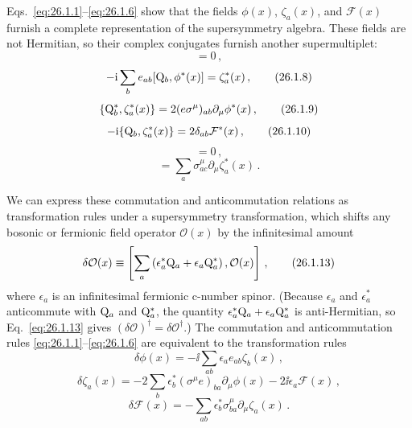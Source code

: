 Eqs.~\eqref{eq:26.1.1}--\eqref{eq:26.1.6} show that the fields
\(\phi(x)\), \(\zeta_a(x)\), and \(\mathcal{F}(x)\) furnish a complete
representation of the supersymmetry algebra. These fields are not Hermitian,
so their complex conjugates furnish another supermultiplet:
\begin{equation}
  [\WeylQ_a^*,\phi^*(x)]=0\,,
  \tag{26.1.7}\label{eq:26.1.7}
\end{equation}
\begin{equation}
  -\mathrm{i}\sum_b e_{ab}[\mathrm{Q}_b,\phi^*(x)]=\zeta_a^*(x)\,,
  \tag{26.1.8}\label{eq:26.1.8}
\end{equation}
\begin{equation}
  \{\mathrm{Q}_b^*,\zeta_a^*(x)\}
  =2(e\sigma^\mu)_{ab}\partial_\mu\phi^*(x)\,,
  \tag{26.1.9}\label{eq:26.1.9}
\end{equation}
\begin{equation}
  -\mathrm{i}\{\mathrm{Q}_b,\zeta_a^*(x)\}
  =2\delta_{ab}\mathcal{F}^*(x)\,,
  \tag{26.1.10}\label{eq:26.1.10}
\end{equation}
\begin{equation}
  [\WeylQ_c,\mathcal{F}^*(x)]=0\,,
  \tag{26.1.11}\label{eq:26.1.11}
\end{equation}
\begin{equation}
  [\WeylQ_c^*,\mathcal{F}^*(x)]
  =\sum_a\sigma^\mu_{ac}\partial_\mu\zeta_a^*(x)\,.
  \tag{26.1.12}\label{eq:26.1.12}
\end{equation}

We can express these commutation and anticommutation relations as
transformation rules under a supersymmetry transformation, which shifts any
bosonic or fermionic field operator \(\mathcal{O}(x)\) by the infinitesimal
amount
\begin{equation}
  \delta\mathcal{O}(x)
  \equiv
  \left[\sum_a\left(\epsilon_a^*\mathrm{Q}_a
    +\epsilon_a\mathrm{Q}_a^*\right),\mathcal{O}(x)\right]\,,
  \tag{26.1.13}\label{eq:26.1.13}
\end{equation}
where \(\epsilon_a\) is an infinitesimal fermionic c-number spinor. (Because
\(\epsilon_a\) and \(\epsilon_a^*\) anticommute with \(\mathrm{Q}_a\) and
\(\mathrm{Q}_a^*\), the quantity
\(\epsilon_a^*\mathrm{Q}_a+\epsilon_a\mathrm{Q}_a^*\) is anti-Hermitian, so
Eq.~\eqref{eq:26.1.13} gives
\((\delta\mathcal{O})^\dagger=\delta\mathcal{O}^\dagger\).) The commutation
and anticommutation rules \eqref{eq:26.1.1}--\eqref{eq:26.1.6} are
equivalent to the transformation rules
\begin{equation}
  \delta\phi(x)
  =-\ii\sum_{ab}\epsilon_a e_{ab}\zeta_b(x)\,,
  \tag{26.1.14}\label{eq:26.1.14}
\end{equation}
\begin{equation}
  \delta\zeta_a(x)
  =-2\sum_b\epsilon_b^*(\sigma^\mu e)_{ba}\partial_\mu\phi(x)
    -2\ii\epsilon_a\mathcal{F}(x)\,,
  \tag{26.1.15}\label{eq:26.1.15}
\end{equation}
\begin{equation}
  \delta\mathcal{F}(x)
  =-\sum_{ab}\epsilon_b^*\sigma^\mu_{ba}\partial_\mu\zeta_a(x)\,.
  \tag{26.1.16}\label{eq:26.1.16}
\end{equation}

